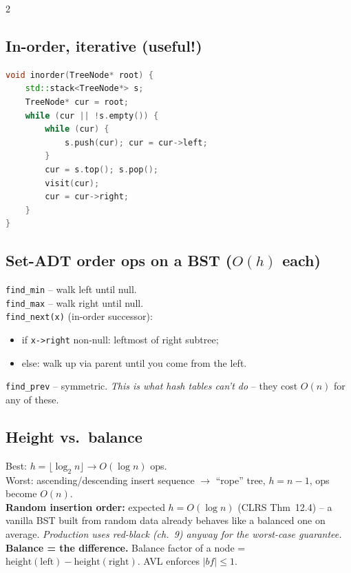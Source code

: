 \documentclass[10pt]{article}
\begin{document}
\begin{multicols}{2}
\subsection*{In-order, iterative (useful!)}
\begin{lstlisting}[language=C++]
void inorder(TreeNode* root) {
    std::stack<TreeNode*> s;
    TreeNode* cur = root;
    while (cur || !s.empty()) {
        while (cur) {
            s.push(cur); cur = cur->left;
        }
        cur = s.top(); s.pop();
        visit(cur);
        cur = cur->right;
    }
}
\end{lstlisting}

\subsection*{Set-ADT order ops on a BST ($O(h)$ each)}
\texttt{find\_min} -- walk left until null.\\
\texttt{find\_max} -- walk right until null.\\
\texttt{find\_next(x)} (in-order successor):
\begin{itemize}
    \item if \texttt{x->right} non-null: leftmost of right subtree;
    \item else: walk up via parent until you come from the left.
\end{itemize}
\texttt{find\_prev} -- symmetric. \emph{This is what hash tables
can't do} -- they cost $O(n)$ for any of these.

\subsection*{Height vs.\ balance}
Best: $h = \lfloor \log_2 n \rfloor \to O(\log n)$ ops.\\
Worst: ascending/descending insert sequence $\to$ ``rope'' tree,
$h = n - 1$, ops become $O(n)$.\\
\textbf{Random insertion order:} expected $h = O(\log n)$ (CLRS
Thm~12.4) -- a vanilla BST built from random data already behaves
like a balanced one on average. \emph{Production uses red-black
(ch.~9) anyway for the worst-case guarantee.}
\textbf{Balance = the difference.}
Balance factor of a node = $\text{height}(\text{left}) -
\text{height}(\text{right})$. AVL enforces $|bf| \leq 1$.


\end{multicols}
\end{document}
